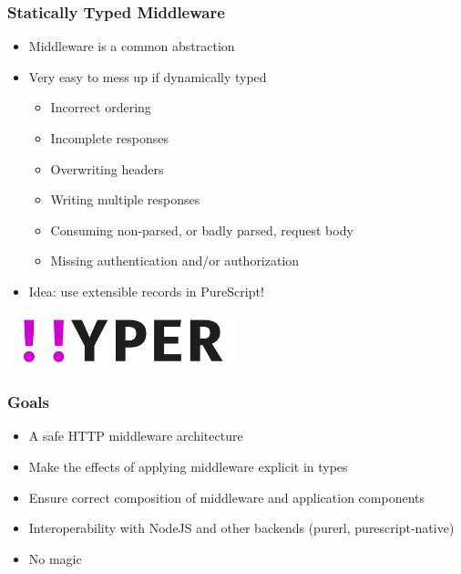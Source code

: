 \begin{frame}
  \frametitle{Statically Typed Middleware}
  \begin{itemize}
    \pause
    \item<+-> Middleware is a common abstraction
    \item<+-> Very easy to mess up if dynamically typed
      \begin{itemize}
        \item<+-> Incorrect ordering
        \item<+-> Incomplete responses
        \item<+-> Overwriting headers
        \item<+-> Writing multiple responses
        \item<+-> Consuming non-parsed, or badly parsed, request body
        \item<+-> Missing authentication and/or authorization
      \end{itemize}
    \item<+-> Idea: use extensible records in PureScript!
  \end{itemize}
\end{frame}


%
%


\begin{frame}
  \begin{center}
    \vfill\vfill
    \includegraphics[width=0.5\textwidth]{src/graphics/hyper.png}\\
    \vspace{1em}
    \vfill\vfill
  \end{center}
\end{frame}

\begin{frame}
  \frametitle{Goals}
  \begin{itemize}
    \pause
    \item<+-> A safe HTTP middleware architecture
    \item<+-> Make the effects of applying middleware explicit in types
    \item<+-> Ensure correct composition of middleware and application components
    \item<+-> Interoperability with NodeJS and other backends (purerl, purescript-native)
    \item<+-> No magic
  \end{itemize}
\end{frame}

